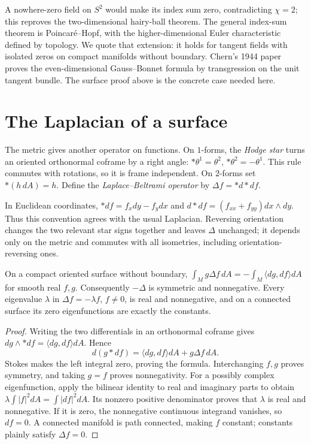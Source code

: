 \begin{remark}
A nowhere-zero field on $S^2$ would make its index sum zero, contradicting $\chi=2$; this reproves the two-dimensional hairy-ball theorem. The general index-sum theorem is Poincar\'e--Hopf, with the higher-dimensional Euler characteristic defined by topology. We quote that extension: it holds for tangent fields with isolated zeros on compact manifolds without boundary. Chern's 1944 paper proves the even-dimensional Gauss--Bonnet formula by transgression on the unit tangent bundle. The surface proof above is the concrete case needed here.
\end{remark}

\section{The Laplacian of a surface}

The metric gives another operator on functions. On $1$-forms, the \emph{Hodge star} turns an oriented orthonormal coframe by a right angle: $\ast\theta^1=\theta^2$, $\ast\theta^2=-\theta^1$. This rule commutes with rotations, so it is frame independent. On $2$-forms set $\ast(h\,dA)=h$. Define the \emph{Laplace--Beltrami operator} by $\Delta f=\ast d\ast df$.

In Euclidean coordinates, $\ast df=f_xdy-f_ydx$ and $d\ast df=(f_{xx}+f_{yy})dx\wedge dy$. Thus this convention agrees with the usual Laplacian. Reversing orientation changes the two relevant star signs together and leaves $\Delta$ unchanged; it depends only on the metric and commutes with all isometries, including orientation-reversing ones.

\begin{proposition}\label{prop:green}
On a compact oriented surface without boundary,
$\int_M g\Delta f\,dA=-\int_M\langle dg,df\rangle dA$ for smooth real $f,g$. Consequently $-\Delta$ is symmetric and nonnegative. Every eigenvalue $\lambda$ in $\Delta f=-\lambda f$, $f\ne0$, is real and nonnegative, and on a connected surface its zero eigenfunctions are exactly the constants.
\end{proposition}

\begin{proof}
Writing the two differentials in an orthonormal coframe gives $dg\wedge\ast df=\langle dg,df\rangle dA$. Hence
\[
d(g\ast df)=\langle dg,df\rangle dA+g\Delta f\,dA.
\]
Stokes makes the left integral zero, proving the formula. Interchanging $f,g$ proves symmetry, and taking $g=f$ proves nonnegativity. For a possibly complex eigenfunction, apply the bilinear identity to real and imaginary parts to obtain
$\lambda\int|f|^2dA=\int|df|^2dA$. Its nonzero positive denominator proves that $\lambda$ is real and nonnegative. If it is zero, the nonnegative continuous integrand vanishes, so $df=0$. A connected manifold is path connected, making $f$ constant; constants plainly satisfy $\Delta f=0$.
\end{proof}

